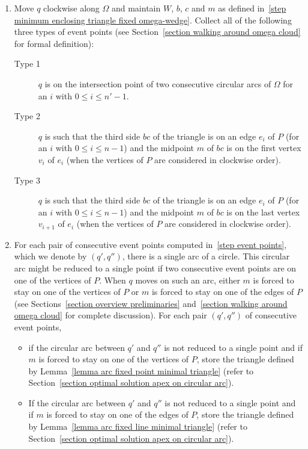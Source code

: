 \documentclass[11pt, oneside]{article}
\begin{document}
\begin{algorithm}
\begin{enumerate}
\item\label{step event points} 
Move $q$ clockwise along $\Omega$
and maintain $W$, $b$, $c$ and $m$
as defined in~\ref{step minimum enclosing triangle fixed omega-wedge}.
Collect all of the following three types of event points
(see Section~\ref{section walking around omega cloud}
for formal definition):
\begin{description}
\item[Type 1]
$q$ is on the intersection point of two consecutive circular arcs of $\Omega$ 
for an $i$ with $0\leq i \leq n'-1$.

\item[Type 2]
$q$ is such that the third side $bc$ of the triangle
is on an edge $e_i$ of $P$
(for an $i$ with $0\leq i \leq n-1$)
and the midpoint $m$ of $bc$
is on the first vertex $v_i$ of $e_i$
(when the vertices of $P$ are considered in clockwise order).

\item[Type 3]
$q$ is such that the third side $bc$ of the triangle
is on an edge $e_i$ of $P$
(for an $i$ with $0\leq i \leq n-1$)
and the midpoint $m$ of $bc$
is on the last vertex $v_{i+1}$ of $e_i$
(when the vertices of $P$ are considered in clockwise order).
\end{description}

\item\label{step minimum enclosing triangle between two event points}
For each pair of consecutive event points
computed in~\ref{step event points},
which we denote by $(q',q'')$,
there is a single arc of a circle.
This circular arc 
might be reduced to a single point
if two consecutive event points 
are on one of the vertices of $P$.
When $q$ moves on such an arc,
either $m$ is forced to stay 
on one of the vertices of $P$
or $m$ is forced to stay on one of the edges of $P$
(see Sections~\ref{section overview preliminaries}
and~\ref{section walking around omega cloud}
for complete discussion).
For each pair $(q',q'')$ of consecutive event points,
\begin{itemize}
\item if the circular arc between $q'$ and $q''$ 
is not reduced to a single point
and if $m$ is forced to stay 
on one of the vertices of $P$,
store the triangle defined by Lemma~\ref{lemma arc fixed point minimal triangle}
(refer to Section~\ref{section optimal solution apex on circular arc}).

\item If the circular arc between $q'$ and $q''$ 
is not reduced to a single point
and if $m$ is forced to stay 
on one of the edges of $P$,
store the triangle defined by Lemma~\ref{lemma arc fixed line minimal triangle}
(refer to Section~\ref{section optimal solution apex on circular arc}).


\end{itemize}
\end{enumerate}
\end{algorithm}
\end{document}
